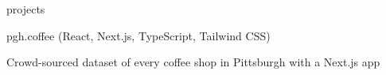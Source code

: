 \documentclass{resume} %
\begin{document}

 \begin{rSection}
 {projects
 }

   \begin{rSubsection}{pgh.coffee {\normalfont (React, Next.js, TypeScript, Tailwind CSS)}}{}{}{}
   \item Crowd-sourced dataset of every coffee shop in Pittsburgh with a Next.js app
   \item \href{https://pgh.coffee/}{} \textbar \ \href{https://github.com/Johngeorgesample/pgh-coffee}{}
   \end{rSubsection}






\end{rSection}
\end{document}
